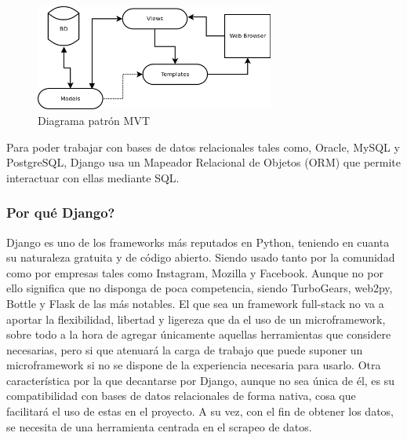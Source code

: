 \begin{figure} [H]
	\centering
	\includegraphics[width=0.7\textwidth]{fig/DjangoMVT.png}
	\caption[Diagrama patrón MVT]{Diagrama patrón MVT \footnotemark}
	\label{fig:ej1}
\end{figure}

Para poder trabajar con bases de datos relacionales tales como, Oracle, MySQL y PostgreSQL, Django usa un Mapeador Relacional de Objetos (ORM) que permite interactuar con ellas mediante SQL.

\subsubsection{Por qué Django?}
Django es uno de los frameworks más reputados en Python, teniendo en cuanta su naturaleza gratuita y de código abierto. Siendo usado tanto por la comunidad como por empresas tales como Instagram, Mozilla y Facebook. Aunque no por ello significa que no disponga de poca competencia, siendo TurboGears, web2py, Bottle y Flask de las más notables.
\newline
\newline
El que sea un framework full-stack no va a aportar la flexibilidad, libertad y ligereza que da el uso de un microframework, sobre todo a la hora de agregar únicamente aquellas herramientas que considere necesarias, pero si que atenuará la carga de trabajo que puede suponer un microframework si no se dispone de la experiencia necesaria para usarlo.
\newline
\newline
Otra característica por la que decantarse por Django, aunque no sea única de él, es su compatibilidad con bases de datos relacionales de forma nativa, cosa que facilitará el uso de estas en el proyecto.\newline
\newline
A su vez, con el fin de obtener los datos, se necesita de una herramienta centrada en el scrapeo de datos.

